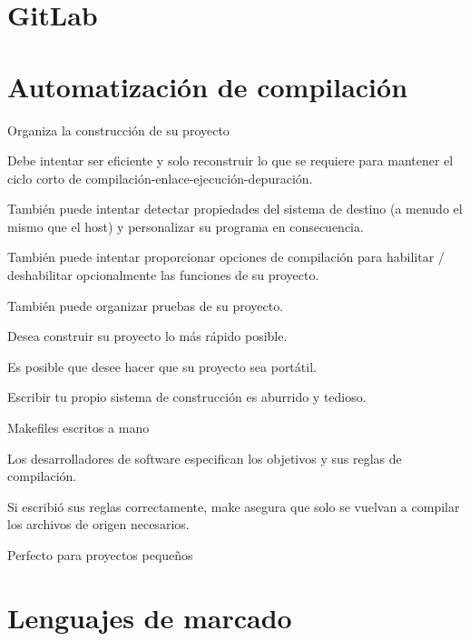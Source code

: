 \section{GitLab}
\lipsum[1]
\begin{figure}
	
\end{figure}
\lipsum[1]

\section{Automatización de compilación}

Organiza la construcción de su proyecto

Debe intentar ser eficiente y solo reconstruir lo que se requiere para mantener el ciclo corto de compilación-enlace-ejecución-depuración.

También puede intentar detectar propiedades del sistema de destino (a menudo el mismo que el host) y personalizar su programa en consecuencia.

También puede intentar proporcionar opciones de compilación para habilitar / deshabilitar opcionalmente las funciones de su proyecto.

También puede organizar pruebas de su proyecto.

Desea construir su proyecto lo más rápido posible.

Es posible que desee hacer que su proyecto sea portátil.

Escribir tu propio sistema de construcción es aburrido y tedioso.

Makefiles escritos a mano

Los desarrolladores de software especifican los objetivos y sus reglas de compilación.

Si escribió sus reglas correctamente, make asegura que solo se vuelvan a compilar los archivos de origen necesarios.

Perfecto para proyectos pequeños
\section{Lenguajes de marcado}


